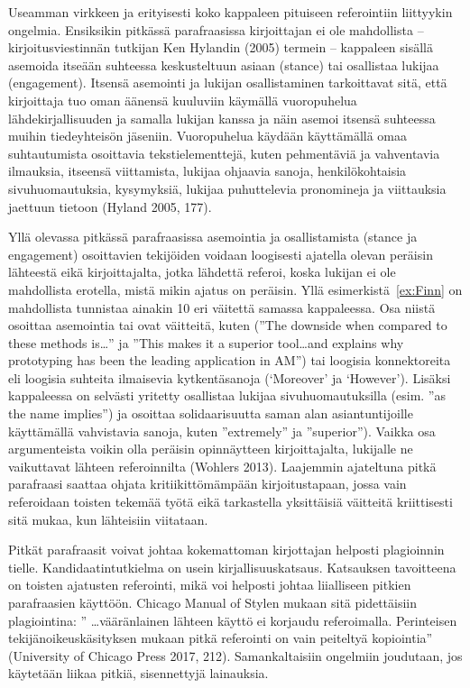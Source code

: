 \documentclass[finnish, 12pt, a4paper, elec, utf8, a-2b, online]{aaltothesis}
\begin{document}
Useamman virkkeen ja erityisesti koko kappaleen pituiseen referointiin 
liittyykin ongelmia. Ensiksikin pitkässä parafraasissa kirjoittajan ei ole 
mahdollista – kirjoitusviestinnän tutkijan Ken Hylandin (2005) termein – 
kappaleen sisällä asemoida itseään suhteessa keskusteltuun asiaan (stance) tai 
osallistaa lukijaa (engagement). Itsensä asemointi ja lukijan osallistaminen 
tarkoittavat sitä, että kirjoittaja tuo oman äänensä kuuluviin käymällä 
vuoropuhelua lähdekirjallisuuden ja samalla lukijan kanssa ja näin asemoi 
itsensä suhteessa muihin tiedeyhteisön jäseniin. Vuoropuhelua käydään 
käyttämällä omaa suhtautumista osoittavia tekstielementtejä, kuten pehmentäviä 
ja vahventavia ilmauksia, itseensä viittamista, lukijaa ohjaavia sanoja, 
henkilökohtaisia sivuhuomautuksia, kysymyksiä, lukijaa puhuttelevia pronomineja 
ja viittauksia jaettuun tietoon (Hyland 2005, 177).

Yllä olevassa pitkässä parafraasissa asemointia ja osallistamista (stance ja 
engagement) osoittavien tekijöiden voidaan loogisesti ajatella olevan peräisin 
lähteestä eikä kirjoittajalta, jotka lähdettä referoi, koska lukijan ei ole 
mahdollista erotella, mistä mikin ajatus on peräisin. Yllä 
esimerkistä~\ref{ex:Finn} on mahdollista tunnistaa ainakin 10 eri väitettä 
samassa kappaleessa. Osa niistä osoittaa asemointia tai ovat väitteitä, kuten 
(”The downside when compared to these methods is\ldots” ja ”This makes it a 
superior tool\ldots{}and explains why prototyping has been the leading 
application in AM”) tai loogisia konnektoreita eli loogisia suhteita ilmaisevia 
kytkentäsanoja (‘Moreover’ ja ‘However’). Lisäksi kappaleessa on selvästi 
yritetty osallistaa lukijaa sivuhuomautuksilla (esim. ”as the name implies”) ja 
osoittaa solidaarisuutta saman alan asiantuntijoille käyttämällä vahvistavia 
sanoja, kuten ”extremely” ja ”superior”). Vaikka osa argumenteista voikin olla 
peräisin opinnäytteen kirjoittajalta, lukijalle ne vaikuttavat lähteen 
referoinnilta (Wohlers 2013). Laajemmin ajateltuna pitkä parafraasi saattaa 
ohjata kritiikittömämpään kirjoitustapaan, jossa vain referoidaan toisten 
tekemää työtä eikä tarkastella yksittäisiä väitteitä kriittisesti sitä mukaa, 
kun lähteisiin viitataan.

Pitkät parafraasit voivat johtaa kokemattoman kirjottajan helposti plagioinnin 
tielle. Kandidaatintutkielma on usein kirjallisuuskatsaus. Katsauksen 
tavoitteena on toisten ajatusten referointi, mikä voi helposti johtaa 
liialliseen pitkien parafraasien käyttöön. Chicago Manual of Stylen mukaan sitä 
pidettäisiin plagiointina: ” \ldots vääränlainen lähteen käyttö ei korjaudu referoimalla. Perinteisen tekijänoikeuskäsityksen mukaan pitkä referointi on vain peiteltyä kopiointia” (University of Chicago Press 2017, 212). Samankaltaisiin ongelmiin joudutaan, jos käytetään liikaa pitkiä, sisennettyjä lainauksia.
\end{document}
